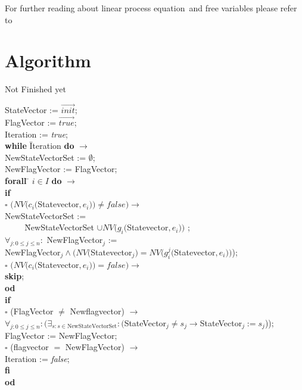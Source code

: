 \documentclass[a4paper,10pt]{article}
\newcommand{\lpe}{linear process equation}
\newcommand{\ovr}{\overrightarrow}
\newcommand{\ti}{\textit}
\newcommand{\tb}{\textbf}
\newcommand{\ra}{$\rightarrow$}
\newcommand{\sq}{$\square$}
\begin{document}
For further reading about \lpe\ and free variables please refer to \cite{LPEfreevar} 
\newpage
\section{Algorithm} \label{sec:alg}
Not Finished yet
\begin{tabbing} 
StateVector := $\ovr{init}$; \\
FlagVector := $\ovr{true}$; \\
Iteration := \ti{true}; \\
\tb{while} \= Iteration \tb{do} \ra \\
  \> NewStateVectorSet := $\emptyset$;\\
  \> NewFlagVector := FlagVector; \\
  \> \tb{forall} \= $i \in I$ \tb{do} \ra \\
  \>  \>   \tb{if} \= \verb" " \=\\
  \>  \>   \sq \> $(NV(c_i($Statevector$,e_i)) \not= false) \rightarrow$ \\
  \>  \>       \> \>NewStateVectorSet := \\
  \>  \>       \> \> \verb"    " \= NewStateVectorSet $\cup NV(g_i($Statevector$,e_i))$ ;\\  
  \>  \>       \>  \>             $\forall_{j : 0 \leqslant j \leq  n}:$ NewFlagVector$_j$ := \\
  \>  \>       \>  \>   \> NewFlagVector$_j \wedge (NV($Statevector$_j) = NV(g_i^j($Statevector$,e_i))$);\\
  \>  \>  \sq \>  $(NV(c_i($Statevector$,e_i)) = false) \rightarrow$ \\
  \>  \>  \> \>\tb{skip};\\
  \>  \tb{od} \\
  \>  \tb{if}  \\
  \>  \sq  \> (FlagVector $\neq$ Newflagvector) \ra \\ 
  \>       \>  \> $\forall_{j:0 \leqslant j \leq n} :(\exists_{s: s \in \text{NewStateVectorSet}}: ($StateVector$_j \not= s_j \rightarrow $StateVector$_j := s_j$)); \\
  \>       \>  \> FlagVector :=  NewFlagVector; \\
  \>  \sq \>  (flagvector $=$ NewFlagVector) \ra  \\
  \>      \> \> Iteration := \ti{false};\\
  \>  \tb{fi} \\
  \tb{od}\\
\end{tabbing} 
\end{document}
